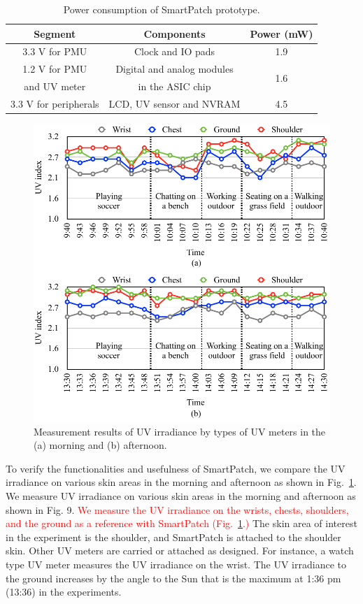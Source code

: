 \documentclass[journal]{IEEEtran}
\begin{document}
\begin{table}
\centering
\caption{Power consumption of SmartPatch prototype.}
\label{table:power_summary}
\begin{tabular}{|c|c|c|}  \hline
Segment 			&Components					&Power (mW)	\\ \hline \hline
3.3 V for PMU		&Clock and IO pads			&1.9	\\ \hline
1.2 V for PMU 		&Digital and analog modules		&\multirow{2}{*}{1.6}		\\
and UV meter 	&in the ASIC chip 				&\\ \hline
3.3 V for peripherals & LCD, UV sensor and NVRAM	&4.5 \\ \hline

\end{tabular}
\end{table}

\begin{figure}
\centering
\includegraphics[width=1.0\hsize]{Figures/UV_measure.pdf}
\caption{Measurement results of UV irradiance by types of UV meters in the (a) morning and (b) afternoon.}
\label{fig:UV_measure}
\end{figure}

To verify the functionalities and usefulness of SmartPatch, we compare the UV irradiance on various skin areas in the morning and afternoon as shown in Fig.~\ref{fig:UV_measure}.
We measure UV irradiance on various skin areas in the morning and afternoon as shown in Fig. 9. \textcolor{red}{We measure the UV irradiance on the wrists, chests, shoulders, and the ground as a reference with SmartPatch (Fig.~\ref{fig:UV_measure}.)} The skin area of interest in the experiment is the shoulder, and SmartPatch is attached to the shoulder skin. Other UV meters are carried or attached as designed. For instance, a watch type UV meter measures the UV irradiance on the wrist. The UV irradiance to the ground increases by the angle to the Sun that is the maximum at 1:36 pm (13:36) in the experiments.
\end{document}
